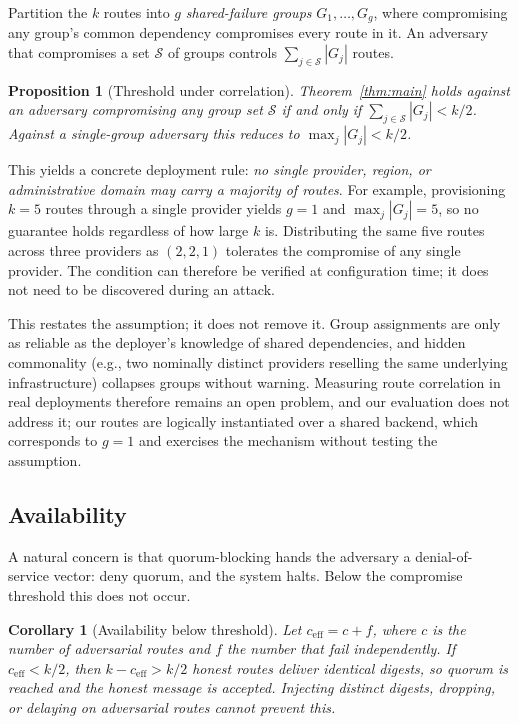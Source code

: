 \documentclass{article}
\newtheorem{proposition}{Proposition}
\newtheorem{corollary}{Corollary}
\begin{document}
Partition the $k$ routes into $g$ \emph{shared-failure groups} $G_1, \dots, G_g$, where compromising any group's common dependency compromises every route in it. An adversary that compromises a set $\mathcal{S}$ of groups controls $\sum_{j \in \mathcal{S}} |G_j|$ routes.

\begin{proposition}[Threshold under correlation]
\label{prop:correlated}
Theorem~\ref{thm:main} holds against an adversary compromising any group set $\mathcal{S}$ if and only if $\sum_{j \in \mathcal{S}} |G_j| < k/2$. Against a single-group adversary this reduces to $\max_j |G_j| < k/2$.
\end{proposition}

This yields a concrete deployment rule: \emph{no single provider, region, or administrative domain may carry a majority of routes}. For example, provisioning $k=5$ routes through a single provider yields $g=1$ and $\max_j |G_j| = 5$, so no guarantee holds regardless of how large $k$ is. Distributing the same five routes across three providers as $(2,2,1)$ tolerates the compromise of any single provider. The condition can therefore be verified at configuration time; it does not need to be discovered during an attack.

This restates the assumption; it does not remove it. Group assignments are only as reliable as the deployer's knowledge of shared dependencies, and hidden commonality (e.g., two nominally distinct providers reselling the same underlying infrastructure) collapses groups without warning. Measuring route correlation in real deployments therefore remains an open problem, and our evaluation does not address it; our routes are logically instantiated over a shared backend, which corresponds to $g=1$ and exercises the mechanism without testing the assumption.

\subsection{Availability}

A natural concern is that quorum-blocking hands the adversary a denial-of-service vector: deny quorum, and the system halts. Below the compromise threshold this does not occur.

\begin{corollary}[Availability below threshold]
\label{cor:availability}
Let $c_{\mathrm{eff}} = c + f$, where $c$ is the number of adversarial routes and $f$ the number that fail independently. If $c_{\mathrm{eff}} < k/2$, then $k - c_{\mathrm{eff}} > k/2$ honest routes deliver identical digests, so quorum is reached and the honest message is accepted. Injecting distinct digests, dropping, or delaying on adversarial routes cannot prevent this.
\end{corollary}
\end{document}
